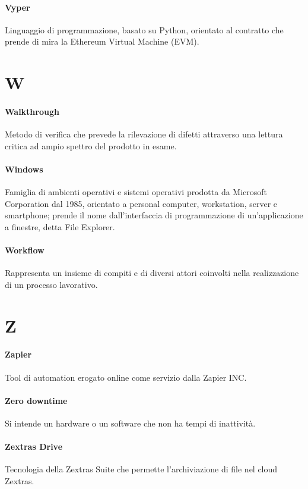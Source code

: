 \documentclass[]{article}
\begin{document}
	\paragraph*{Vyper}
	Linguaggio di programmazione, basato su Python, orientato al contratto che prende di mira la Ethereum Virtual Machine (EVM).

	\newpage

	\section*{W}

	\paragraph*{Walkthrough}
	Metodo di verifica che prevede la rilevazione di difetti attraverso una lettura critica ad ampio spettro del prodotto in esame.

	\paragraph*{Windows}
	Famiglia di ambienti operativi e sistemi operativi prodotta da Microsoft Corporation dal 1985, orientato a personal computer, workstation, server e smartphone; prende il nome dall'interfaccia di programmazione di un'applicazione a finestre, detta File Explorer.

	\paragraph*{Workflow}
	Rappresenta un insieme di compiti e di diversi attori coinvolti nella realizzazione di un processo lavorativo.

	\newpage

	\section*{Z}

	\paragraph*{Zapier}
	Tool di automation erogato online come servizio dalla Zapier INC.

	\paragraph*{Zero downtime}
	Si intende un hardware o un software che non ha tempi di inattività.

	\paragraph*{Zextras Drive}
	Tecnologia della Zextras Suite che permette l'archiviazione di file nel cloud Zextras.
\end{document}
